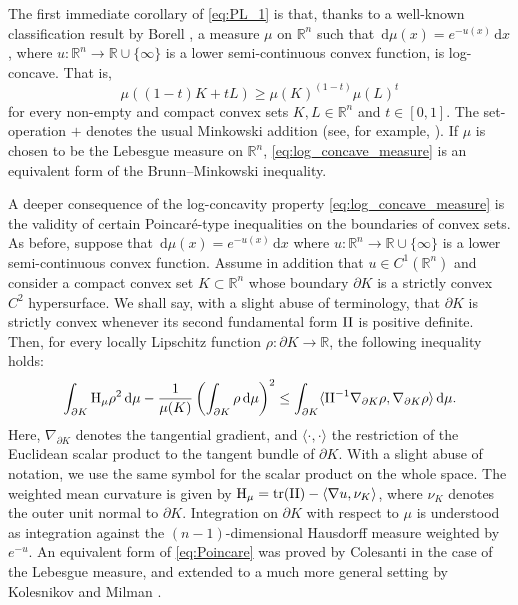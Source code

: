 \documentclass[a4paper, 11pt]{article}
\newcommand{\R}{\mathbb{R}}
\newcommand{\tra}{\mathrm{tr}}
\theoremstyle{definition}
\newcommand{\di}{\, \mathrm{d}}
\begin{document}
The first immediate corollary of \eqref{eq:PL_1} is that, thanks to a well-known classification result by Borell \cite{Borell}, a measure $\mu$ on $\R^n$ such that $\di \mu(x)=e^{-u(x)}\di x$, where $u:\R^n \to \R \cup \{\infty\}$ is a lower semi-continuous convex function, is log-concave. That is, \begin{equation}\label{eq:log_concave_measure} \mu((1-t)K+tL) \geq \mu(K)^{(1-t)}\mu(L)^t \end{equation} for every non-empty and compact convex sets $K,L \in \R^n$ and $t \in [0,1]$. The set-operation $+$ denotes the usual Minkowski addition (see, for example, \cite[Section 3]{SchneiderConvexBodiesBrunn2013}). If $\mu$ is chosen to be the Lebesgue measure on $\R^n$, \eqref{eq:log_concave_measure} is an equivalent form of the Brunn--Minkowski inequality.

A deeper consequence of the log-concavity property \eqref{eq:log_concave_measure} is the validity of certain Poincar\'e-type inequalities on the boundaries of convex sets. As before, suppose that $\di \mu(x)=e^{-u(x)}\di x$ where $u:\R^n \to \R \cup \{\infty\}$ is a lower semi-continuous convex function. Assume in addition that $u\in C^1(\R^n)$ and consider a compact convex set $K \subset \R^n$ whose boundary $\partial K$ is a strictly convex $C^2$ hypersurface. We shall say, with a slight abuse of terminology, that $\partial K$ is strictly convex whenever its second fundamental form ${\rm II}$ is positive definite. Then, for  every locally Lipschitz function $\rho:\partial K\to\R$, the following inequality holds:
\begin{equation}\label{eq:Poincare}
    \int_{\partial K} {\rm H}_\mu \rho^2 \di \mu-\frac{1}{\mu(K)}\left(\int_{\partial K} \rho \di \mu\right)^2\leq\int_{\partial K} \langle {\rm II}^{-1} \nabla_{\partial K} \rho, \nabla_{\partial K} \rho \rangle \di \mu .
\end{equation}
Here, $\nabla_{\partial K}$ denotes the tangential gradient, and $\langle\cdot,\cdot\rangle$ the restriction of the Euclidean scalar product to the tangent bundle of $\partial K$. With a slight abuse of notation, we use the same symbol for the scalar product on the whole space. The weighted mean curvature is given by ${\rm H}_\mu=\tra({\rm II})-\langle \nabla u,\nu_K\rangle$, where $\nu_K$ denotes the outer unit normal to $\partial K$. Integration on $\partial K$ with respect to $\mu$ is understood as integration against the $(n-1)$-dimensional Hausdorff measure weighted by $e^{-u}$. An equivalent form of \eqref{eq:Poincare} was proved by Colesanti \cite{Colesanti_poincare} in the case of the Lebesgue measure, and extended to a much more general setting by Kolesnikov and Milman \cite{Kol_Mil_P}.
\end{document}
